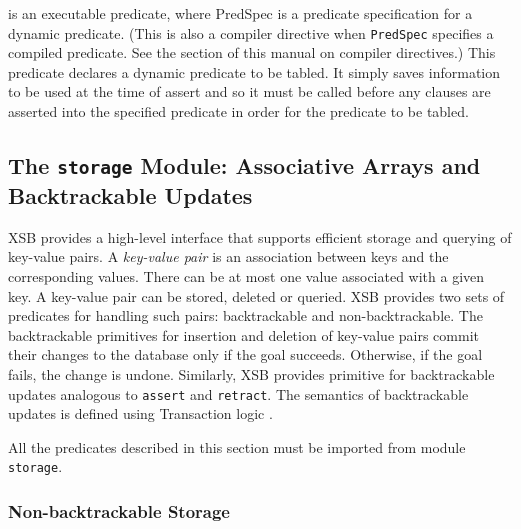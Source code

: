 \begin{description}
is an executable predicate, where PredSpec is a predicate
specification for a dynamic predicate. (This is also a compiler
directive when {\tt PredSpec} specifies a compiled predicate. See the
section of this manual on compiler directives.) This predicate
declares a dynamic predicate to be tabled. It simply saves information
to be used at the time of assert and so it must be called before any
clauses are asserted into the specified predicate in order for the
predicate to be tabled.

\end{description}


\subsection{The {\tt storage} Module: Associative Arrays and Backtrackable Updates}

\label{storage module}
XSB provides a high-level interface that supports efficient storage and
querying of key-value pairs. A \emph{key-value pair} is an association
between keys and the corresponding values. There can be at most one value
associated with a given key. A key-value pair can be stored, deleted or
queried. XSB provides two sets of predicates for handling such pairs:
backtrackable and non-backtrackable. The backtrackable primitives for
insertion and deletion of key-value pairs commit their changes to the
database only if the goal succeeds. Otherwise, if the goal fails, the
change is undone. Similarly, XSB provides primitive for backtrackable
updates analogous to {\tt assert} and {\tt retract}. The semantics of
backtrackable updates is defined using Transaction logic \cite{BoKi94}.

All the predicates described in this section must be imported from
module {\tt storage}.

\subsubsection{Non-backtrackable Storage}

